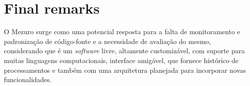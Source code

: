 \documentclass{llncs}
\begin{document}
\section{Final remarks}

O Mezuro surge como uma potencial resposta para a falta de monitoramento e
padronização de código-fonte e a necessidade de avaliação do mesmo,
considerando que é um \textit{software} livre, altamente customizável, com
suporte para muitas linguagens computacionais, interface amigável, que fornece
histórico de processamentos e também com uma arquitetura planejada para
incorporar novas funcionalidades.




\end{document}
